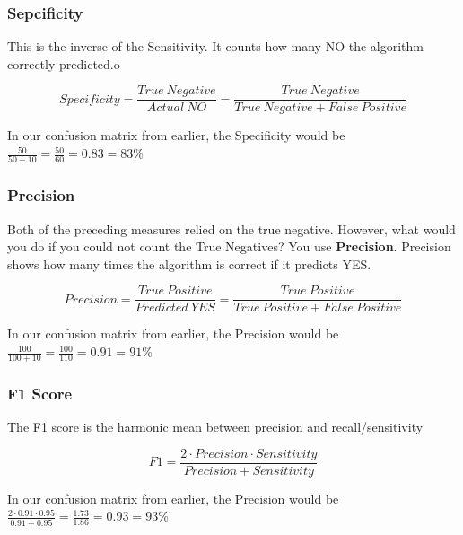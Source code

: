 \documentclass[a4paper, 11pt]{article}
\begin{document}
\subsubsection{Sepcificity}
This is the inverse of the Sensitivity. It counts how many NO the algorithm correctly predicted.o

\begin{equation}
	Specificity= \frac{True\ Negative}{Actual\ NO} = \frac{True\ Negative}{True\ Negative + False\ Positive} 
\end{equation}

\vspace{10px}

In our confusion matrix from earlier, the Specificity would be $\frac{50}{50+ 10} = \frac{50}{60} = 0.83 = 83\%$

\subsubsection{Precision}
Both of the preceding measures relied on the true negative. However, what would you do if you could not count the True Negatives? You use \textbf{Precision}. Precision shows how many times the algorithm is correct if it predicts YES.

\begin{equation}
	Precision = \frac{True\ Positive}{Predicted\ YES} = \frac{True\ Positive}{True\ Positive + False\ Positive}
\end{equation}

\vspace{10px}

In our confusion matrix from earlier, the Precision would be $\frac{100}{100+ 10} = \frac{100}{110} = 0.91 = 91\%$

\subsubsection{F1 Score}

The F1 score is the harmonic mean between precision and recall/sensitivity

\begin{equation}
	F1 = \frac{2 \cdot Precision \cdot Sensitivity}{Precision + Sensitivity} 
\end{equation}

In our confusion matrix from earlier, the Precision would be $\frac{2 \cdot 0.91 \cdot 0.95}{0.91 + 0.95} = \frac{1.73}{1.86} = 0.93 = 93\%$

\vspace{10px}
\end{document}
